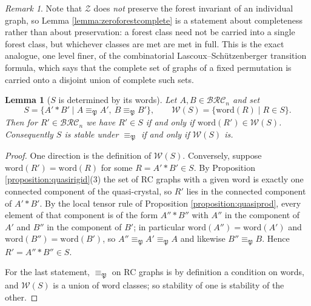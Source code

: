 \documentclass{amsart}
\newtheorem{lemma}{Lemma}[subsection]
\theoremstyle{definition}
\theoremstyle{remark}
\newtheorem*{remark}{Remark}
\numberwithin{equation}{subsection}
\newcommand{\zeromap}{\mathcal{Z}}
\newcommand{\BRC}{\mathcal{BRC}}
\newcommand{\forest}{\mathfrak{P}}
\begin{document}
\begin{remark}
Note that $\zeromap$ does \emph{not} preserve the forest invariant of an individual graph, so Lemma \ref{lemma:zeroforestcomplete} is a statement about completeness rather than about preservation: a forest class need not be carried into a single forest class, but whichever classes are met are met in full. This is the exact analogue, one level finer, of the combinatorial Lascoux--Sch\"utzenberger transition formula, which says that the complete set of graphs of a fixed permutation is carried onto a disjoint union of complete such sets.
\end{remark}

\begin{lemma}[$S$ is determined by its words]\label{lemma:sdetermined}
Let $A,B\in\BRC_n$ and set
$$S=\{A'*B'\mid A\equiv_\forest A',\ B\equiv_\forest B'\},\qquad \mathcal{W}(S)=\{\mathrm{word}(R)\mid R\in S\}.$$
Then for $R'\in\BRC_n$ we have $R'\in S$ if and only if $\mathrm{word}(R')\in\mathcal{W}(S)$. Consequently $S$ is stable under $\equiv_\forest$ if and only if $\mathcal{W}(S)$ is.
\end{lemma}
\begin{proof}
One direction is the definition of $\mathcal{W}(S)$. Conversely, suppose $\mathrm{word}(R')=\mathrm{word}(R)$ for some $R=A'*B'\in S$. By Proposition \ref{proposition:quasirigid}(3) the set of RC graphs with a given word is exactly one connected component of the quasi-crystal, so $R'$ lies in the connected component of $A'*B'$. By the local tensor rule of Proposition \ref{proposition:quasiprod}, every element of that component is of the form $A''*B''$ with $A''$ in the component of $A'$ and $B''$ in the component of $B'$; in particular $\mathrm{word}(A'')=\mathrm{word}(A')$ and $\mathrm{word}(B'')=\mathrm{word}(B')$, so $A''\equiv_\forest A'\equiv_\forest A$ and likewise $B''\equiv_\forest B$. Hence $R'=A''*B''\in S$.

For the last statement, $\equiv_\forest$ on RC graphs is by definition a condition on words, and $\mathcal{W}(S)$ is a union of word classes; so stability of one is stability of the other.
\end{proof}
\end{document}
